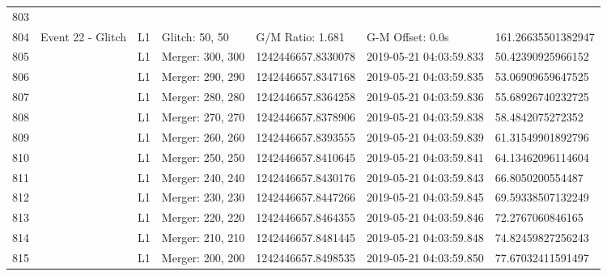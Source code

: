 \begin{longtable}{lllllll}
803  &                                                    &          &                   &                     &                          &                     \\
804  &                                  Event 22 - Glitch &       L1 &    Glitch: 50, 50 &    G/M Ratio: 1.681 &         G-M Offset: 0.0s &  161.26635501382947 \\
805  &                                                    &       L1 &  Merger: 300, 300 &  1242446657.8330078 &  2019-05-21 04:03:59.833 &   50.42390925966152 \\
806  &                                                    &       L1 &  Merger: 290, 290 &  1242446657.8347168 &  2019-05-21 04:03:59.835 &   53.06909659647525 \\
807  &                                                    &       L1 &  Merger: 280, 280 &  1242446657.8364258 &  2019-05-21 04:03:59.836 &   55.68926740232725 \\
808  &                                                    &       L1 &  Merger: 270, 270 &  1242446657.8378906 &  2019-05-21 04:03:59.838 &    58.4842075272352 \\
809  &                                                    &       L1 &  Merger: 260, 260 &  1242446657.8393555 &  2019-05-21 04:03:59.839 &   61.31549901892796 \\
810  &                                                    &       L1 &  Merger: 250, 250 &  1242446657.8410645 &  2019-05-21 04:03:59.841 &   64.13462096114604 \\
811  &                                                    &       L1 &  Merger: 240, 240 &  1242446657.8430176 &  2019-05-21 04:03:59.843 &    66.8050200554487 \\
812  &                                                    &       L1 &  Merger: 230, 230 &  1242446657.8447266 &  2019-05-21 04:03:59.845 &   69.59338507132249 \\
813  &                                                    &       L1 &  Merger: 220, 220 &  1242446657.8464355 &  2019-05-21 04:03:59.846 &    72.2767060846165 \\
814  &                                                    &       L1 &  Merger: 210, 210 &  1242446657.8481445 &  2019-05-21 04:03:59.848 &   74.82459827256243 \\
815  &                                                    &       L1 &  Merger: 200, 200 &  1242446657.8498535 &  2019-05-21 04:03:59.850 &   77.67032411591497 \\

\end{longtable}
